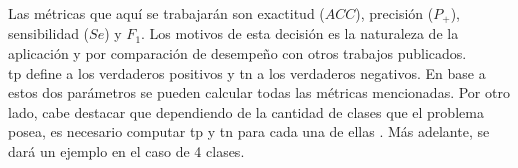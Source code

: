 \indent Las métricas que aquí se trabajarán son exactitud ($ACC$), precisión ($P_+$), sensibilidad ($Se$) y $F_1$.
Los motivos de esta decisión es la naturaleza de la aplicación y por comparación de desempeño con otros trabajos
publicados. \\
\indent \acrshort{tp} define a los verdaderos positivos y \acrshort{tn} a los verdaderos negativos. En base a estos
dos parámetros se pueden calcular todas las métricas mencionadas. Por otro lado, cabe destacar que dependiendo de la
cantidad de clases que el problema posea, es necesario computar \acrshort{tp} y \acrshort{tn} para cada una de ellas
. Más adelante, se dará un ejemplo en el caso de 4 clases.